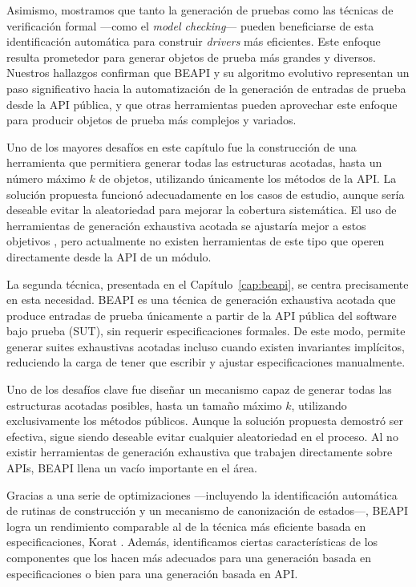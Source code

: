 Asimismo, mostramos que tanto la generación de pruebas como las técnicas de verificación formal —como el \emph{model checking}— 
pueden beneficiarse de esta identificación automática para construir \emph{drivers} más eficientes. 
Este enfoque resulta prometedor para generar objetos de prueba más grandes y diversos. 
Nuestros hallazgos confirman que BEAPI y su algoritmo evolutivo representan un paso significativo hacia la automatización 
de la generación de entradas de prueba desde la API pública, y que otras herramientas pueden aprovechar este enfoque 
para producir objetos de prueba más complejos y variados.

Uno de los mayores desafíos en este capítulo fue la construcción de una herramienta que permitiera generar todas las estructuras acotadas, 
hasta un número máximo \(k\) de objetos, utilizando únicamente los métodos de la API. 
La solución propuesta funcionó adecuadamente en los casos de estudio, aunque sería deseable evitar la aleatoriedad para mejorar la cobertura sistemática. 
El uso de herramientas de generación exhaustiva acotada se ajustaría mejor a estos objetivos \cite{Boyapati02}, 
pero actualmente no existen herramientas de este tipo que operen directamente desde la API de un módulo.

La segunda técnica, presentada en el Capítulo~\ref{cap:beapi}, se centra precisamente en esta necesidad. 
BEAPI es una técnica de generación exhaustiva acotada que produce entradas de prueba únicamente a partir de la API pública del software bajo prueba (SUT), 
sin requerir especificaciones formales. De este modo, permite generar suites exhaustivas acotadas incluso cuando existen invariantes implícitos, 
reduciendo la carga de tener que escribir y ajustar especificaciones manualmente.

Uno de los desafíos clave fue diseñar un mecanismo capaz de generar todas las estructuras acotadas posibles, hasta un tamaño máximo \(k\), 
utilizando exclusivamente los métodos públicos. Aunque la solución propuesta demostró ser efectiva, sigue siendo deseable evitar cualquier aleatoriedad en el proceso. 
Al no existir herramientas de generación exhaustiva que trabajen directamente sobre APIs, BEAPI llena un vacío importante en el área.

Gracias a una serie de optimizaciones —incluyendo la identificación automática de rutinas de construcción y un mecanismo de canonización de estados—, 
BEAPI logra un rendimiento comparable al de la técnica más eficiente basada en especificaciones, Korat \cite{Boyapati02}. 
Además, identificamos ciertas características de los componentes que los hacen más adecuados para una generación basada en especificaciones o bien para una generación basada en API.


